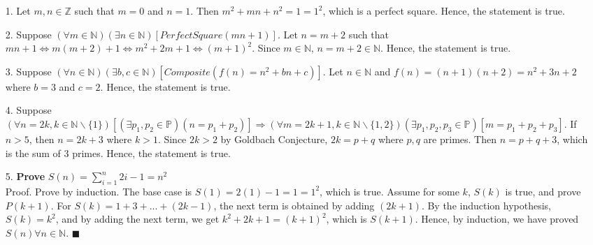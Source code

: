 \documentclass[11pt]{exam}
\author{@dante}
\begin{document}

\begin{enumerate}[leftmargin=0pt]

\item[1.] Let $m, n \in \mathbb{Z}$ such that $m = 0$ and $n = 1$. Then $m^2 + mn + n^2 = 1 = 1^2$, which is a perfect square. Hence, the statement is true.

\item[2.] Suppose $(\forall m \in \mathbb{N})(\exists n \in \mathbb{N})[PerfectSquare(mn + 1)]$. Let $n = m + 2$ such that $mn + 1 \Leftrightarrow m(m + 2) + 1 \Leftrightarrow m^2 + 2m + 1 \Leftrightarrow (m + 1)^2$. Since $m \in \mathbb{N}$, $n = m + 2 \in \mathbb{N}$. Hence, the statement is true.

\item[3.] Suppose $(\forall n \in \mathbb{N})(\exists b, c \in \mathbb{N})[Composite(f(n) = n^2 + bn + c)]$. Let $n \in \mathbb{N}$ and $f(n) = (n + 1)(n + 2) = n^2 + 3n + 2$ where $b = 3$ and $c = 2$. Hence, the statement is true.

\item[4.] Suppose $(\forall n = 2k, k \in \mathbb{N} \backslash \{1\})[(\exists p_1, p_2 \in \mathbb{P})(n = p_1 + p_2)] \Rightarrow (\forall m = 2k + 1, k \in \mathbb{N} \backslash \{1, 2\})(\exists p_1, p_2, p_3 \in \mathbb{P})[m = p_1 + p_2 + p_3]$. If $n > 5$, then $n = 2k + 3$ where $k > 1$. Since $2k > 2$ by Goldbach Conjecture, $2k = p + q$ where $p, q$ are primes. Then $n = p + q + 3$, which is the sum of 3 primes. Hence, the statement is true.

\item[5.] \textbf{Prove} $S(n) = \sum_{i = 1}^{n} 2i - 1 = n^2$ \\
Proof. Prove by induction. The base case is $S(1) = 2(1) - 1 = 1 = 1^2$, which is true. Assume for some $k$, $S(k)$ is true, and prove $P(k + 1)$. For $S(k) = 1 + 3 +...+ (2k - 1)$, the next term is obtained by adding $(2k + 1)$. By the induction hypothesis, $S(k) = k^2$, and by adding the next term, we get $k^2 + 2k + 1 = (k + 1)^2$, which is $S(k + 1)$. Hence, by induction, we have proved $S(n) \forall n \in \mathbb{N}$. $\blacksquare$


\end{enumerate}
\end{document}
